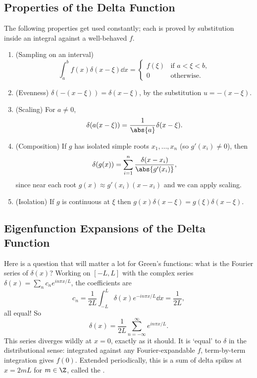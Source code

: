 \subsection{Properties of the Delta Function}

The following properties get used constantly; each is proved by substitution inside an integral against a well-behaved $f$.

\begin{enumerate}[label=(\roman*)]
    \item (Sampling on an interval)
    $$
    \int_a^b f(x) \delta(x - \xi) \dd x = \begin{cases}
        f(\xi) &\mbox{if } a < \xi < b, \\
        0 &\mbox{otherwise}.
    \end{cases}
    $$
    \item (Evenness) $\delta(-(x - \xi)) = \delta(x - \xi)$, by the substitution $u = -(x - \xi)$.
    \item (Scaling) For $a \neq 0$,
    $$
    \delta(a(x - \xi)) = \frac{1}{\abs{a}}\delta(x - \xi).
    $$
    \item (Composition) If $g$ has isolated simple roots $x_1, \dots, x_n$ (so $g'(x_i) \neq 0$), then
    $$
    \delta(g(x)) = \sum_{i = 1}^{n} \frac{\delta(x - x_i)}{\abs{g'(x_i)}},
    $$
    since near each root $g(x) \approx g'(x_i)(x - x_i)$ and we can apply scaling.
    \item (Isolation) If $g$ is continuous at $\xi$ then $g(x) \delta(x - \xi) = g(\xi)\delta(x - \xi)$.
\end{enumerate}

\subsection{Eigenfunction Expansions of the Delta Function}

Here is a question that will matter a lot for Green's functions: what is the Fourier series of $\delta(x)$? Working on $[-L, L]$ with the complex series $\delta(x) = \sum_n c_n e^{i n \pi x/L}$, the coefficients are
$$
c_n = \frac{1}{2L}\int_{-L}^{L} \delta(x) e^{-i n \pi x/L} \dd x = \frac{1}{2L},
$$
all equal! So
$$
\delta(x) = \frac{1}{2L} \sum_{n = -\infty}^{\infty} e^{i n \pi x / L}.
$$
This series diverges wildly at $x = 0$, exactly as it should. It is `equal' to $\delta$ in the distributional sense: integrated against any Fourier-expandable $f$, term-by-term integration gives $f(0)$. Extended periodically, this is a sum of delta spikes at $x = 2mL$ for $m \in \Z$, called the .

